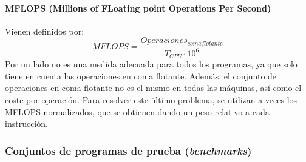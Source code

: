 \documentclass[12pt,spanish]{article}
\begin{document}
\paragraph{MFLOPS (Millions of FLoating point Operations Per Second)}
Vienen definidos por:
\begin{equation}
MFLOPS=\frac{Operaciones_{coma flotante}}{T_{CPU} \cdot 10^6}
\end{equation}
Por un lado no es una medida adecuada para todos los programas, ya que solo tiene en cuenta las operaciones en coma flotante. Además, el conjunto de operaciones en coma flotante no es el mismo en todas las máquinas, así como el coste por operación. Para resolver este último problema, se utilizan a veces los MFLOPS normalizados, que se obtienen dando un peso relativo a cada instrucción.

\subsubsection{Conjuntos de programas de prueba (\textit{benchmarks})}
\end{document}
